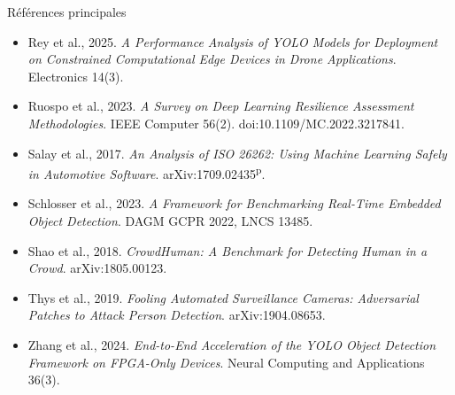 \documentclass[aspectratio=169,11pt]{beamer}
\newcommand{\pre}{\textsuperscript{\color{acc}p}}
\begin{document}
\begin{frame}[allowframebreaks]{Références principales}
\begin{itemize}
{          Applications: Reliability Issues and Potential Solutions}. IEEE TNS 71(4).
    \item Rey et al., 2025. \textit{A Performance Analysis of YOLO Models for Deployment on
          Constrained Computational Edge Devices in Drone Applications}. Electronics 14(3).
    \item Ruospo et al., 2023. \textit{A Survey on Deep Learning Resilience Assessment
          Methodologies}. IEEE Computer 56(2). doi:10.1109/MC.2022.3217841.
    \item Salay et al., 2017. \textit{An Analysis of ISO 26262: Using Machine Learning Safely
          in Automotive Software}. arXiv:1709.02435\pre.
    \item Schlosser et al., 2023. \textit{A Framework for Benchmarking Real-Time Embedded
          Object Detection}. DAGM GCPR 2022, LNCS 13485.
    \item Shao et al., 2018. \textit{CrowdHuman: A Benchmark for Detecting Human in a Crowd}.
          arXiv:1805.00123.
    \item Thys et al., 2019. \textit{Fooling Automated Surveillance Cameras: Adversarial
          Patches to Attack Person Detection}. arXiv:1904.08653.
    \item Zhang et al., 2024. \textit{End-to-End Acceleration of the YOLO Object Detection
          Framework on FPGA-Only Devices}. Neural Computing and Applications 36(3).
  \end{itemize}
\end{frame}
\end{document}
